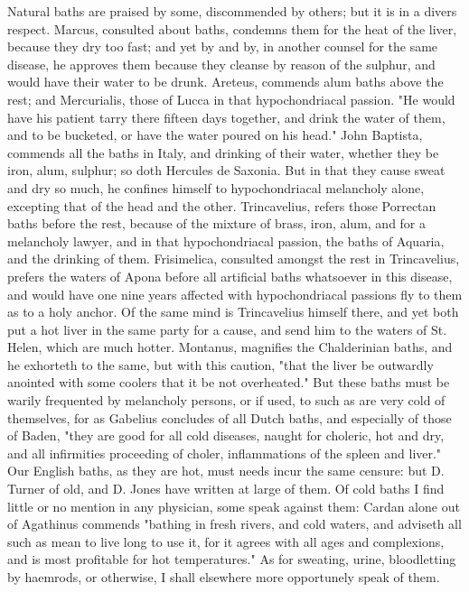 {Natural baths are praised by some, discommended by others; but it is in a divers respect. Marcus,  consulted about baths, condemns them for the heat of the liver, because they dry too fast; and yet by and by, in another counsel for the same disease, he approves them because they cleanse by reason of the sulphur, and would have their water to be drunk. Areteus,  commends alum baths above the rest; and Mercurialis,  those of Lucca in that hypochondriacal passion. "He would have his patient tarry there fifteen days together, and drink the water of them, and to be bucketed, or have the water poured on his head." John Baptista,  commends all the baths in Italy, and drinking of their water, whether they be iron, alum, sulphur; so doth Hercules de Saxonia. But in that they cause sweat and dry so much, he confines himself to hypochondriacal melancholy alone, excepting that of the head and the other. Trincavelius,  refers those Porrectan baths before the rest, because of the mixture of brass, iron, alum, and  for a melancholy lawyer, and  in that hypochondriacal passion, the baths of Aquaria, and  the drinking of them. Frisimelica, consulted amongst the rest in Trincavelius,  prefers the waters of Apona before all artificial baths whatsoever in this disease, and would have one nine years affected with hypochondriacal passions fly to them as to a holy anchor. Of the same mind is Trincavelius himself there, and yet both put a hot liver in the same party for a cause, and send him to the waters of St. Helen, which are much hotter. Montanus,  magnifies the Chalderinian baths, and  he exhorteth to the same, but with this caution, "that the liver be outwardly anointed with some coolers that it be not overheated." But these baths must be warily frequented by melancholy persons, or if used, to such as are very cold of themselves, for as Gabelius concludes of all Dutch baths, and especially of those of Baden, "they are good for all cold diseases, naught for choleric, hot and dry, and all infirmities proceeding of choler, inflammations of the spleen and liver." Our English baths, as they are hot, must needs incur the same censure: but D. Turner of old, and D. Jones have written at large of them. Of cold baths I find little or no mention in any physician, some speak against them: Cardan alone out of Agathinus commends "bathing in fresh rivers, and cold waters, and adviseth all such as mean to live long to use it, for it agrees with all ages and complexions, and is most profitable for hot temperatures." As for sweating, urine, bloodletting by haemrods, or otherwise, I shall elsewhere more opportunely speak of them.

}

